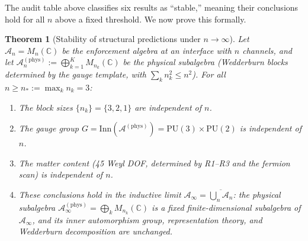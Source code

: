 \documentclass[11pt,a4paper]{article}
\newtheorem{theorem}{Theorem}[section]
\theoremstyle{definition}
\begin{document}
The audit table above classifies six results as ``stable,'' meaning
their conclusions hold for all $n$ above a fixed threshold.  We now
prove this formally.

\begin{theorem}[Stability of structural predictions under
$n \to \infty$]\label{thm:structural_stability}
Let $\mathcal{A}_n = M_n(\mathbb{C})$ be the enforcement algebra at
an interface with $n$ channels, and let $\mathcal{A}_n^{(\mathrm{phys})}
:= \bigoplus_{k=1}^K M_{n_k}(\mathbb{C})$ be the physical subalgebra
(Wedderburn blocks determined by the gauge template, with
$\sum_k n_k^2 \le n^2$).  For all $n \ge n_* := \max_k n_k = 3$:
\begin{enumerate}[label=(\roman*),nosep]
  \item The block sizes $\{n_k\} = \{3, 2, 1\}$ are independent of $n$.
  \item The gauge group
  $G = \mathrm{Inn}(\mathcal{A}^{(\mathrm{phys})}) =
  \mathrm{PU}(3) \times \mathrm{PU}(2)$ is independent of $n$.
  \item The matter content (45 Weyl DOF, determined by R1--R3 and the
  fermion scan) is independent of $n$.
  \item These conclusions hold in the inductive limit
  $\mathcal{A}_\infty = \overline{\bigcup_n \mathcal{A}_n}$: the
  physical subalgebra $\mathcal{A}_\infty^{(\mathrm{phys})} =
  \bigoplus_k M_{n_k}(\mathbb{C})$ is a fixed finite-dimensional
  subalgebra of $\mathcal{A}_\infty$, and its inner automorphism
  group, representation theory, and Wedderburn decomposition are
  unchanged.
\end{enumerate}
\end{theorem}
\end{document}
